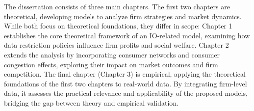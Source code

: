 \documentclass[11pt]{article}
\begin{document}

The dissertation consists of three main chapters. The first two chapters are theoretical, developing models to analyze firm strategies and market dynamics. While both focus on theoretical foundations, they differ in scope: 
Chapter 1 establishes the core theoretical framework of an IO-related model, examining how data restriction policies influence firm profits and social welfare.
Chapter 2 extends the analysis by incorporating consumer networks and consumer congestion effects, exploring their impact on market outcomes and firm competition.
The final chapter (Chapter 3) is empirical, applying the theoretical foundations of the first two chapters to real-world data. By integrating firm-level data, it assesses the practical relevance and applicability of the proposed models, bridging the gap between theory and empirical validation.
\vspace{5mm}
\end{document}
